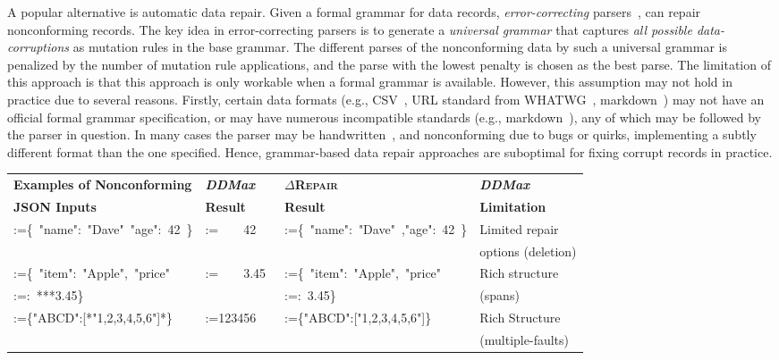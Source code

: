 \documentclass[acmsmall,screen,review,anonymous]{acmart}
\makeatletter
\newcommand{\dtask}{data repair\xspace}
\newcommand{\approach}{\textsc{$\Delta$Repair}\xspace}
\newcommand{\ddmax}{\textit{DDMax}\xspace}
\newcommand\letterboxedinTable[1]{%
\setlength{\fboxsep}{0pt}%
  \@tfor\@ii:=#1\do{%
    \fcolorbox{white}{light-gray}{\tiny \texttt{\strut\@ii}}%
  }%
}
\makeatother
\begin{document}
A popular alternative is automatic \dtask.
Given a formal grammar for data records,
\emph{error-correcting} parsers~\cite{aho1972minimum,diekmann2020dont,parr2011ll}, can
repair nonconforming records.
The key idea in error-correcting parsers is to generate a \emph{universal grammar}
that captures \emph{all possible data-corruptions} as mutation rules
in the base grammar.
The different parses of the nonconforming data by such a universal grammar is
penalized by the number of mutation rule applications, and the parse with the
lowest penalty is chosen as the best parse.
The limitation of this approach is that this approach is only workable when
a formal grammar is available.
However,
this assumption may not hold in practice due to several reasons.
Firstly,
certain data formats (e.g., CSV~\cite{taocp},
URL standard from WHATWG~\cite{whatwgurl,urldisagree}, markdown~\cite{gruber2004markdown})
may not have an official formal grammar specification, or may
have numerous incompatible standards
(e.g., markdown~\cite{gruber2004markdown}), any of which may be followed by the
parser in question. In many cases the parser may be handwritten~\cite{uncommongrammars,uncommongrammars2}, and nonconforming due to bugs or quirks,
implementing a subtly different format than the one specified.
Hence, grammar-based \dtask approaches
are suboptimal for fixing corrupt records in practice.

\begin{table*}\centering

\caption{\ddmax vs. \approach: examples showing limitations of \ddmax and the strengths of \approach}
{%
\begin{tabular}{|l | l | l | l |}
\hline
\textbf{Examples of Nonconforming}& \textbf{\ddmax} & \textbf{\approach} & \textbf{\ddmax} \\
\textbf{JSON Inputs} & \textbf{Result} & \textbf{Result} & \textbf{Limitation} \\
\hline
\letterboxedinTable{\{\ "name":\ "Dave"\ "age":\ 42\ \}} &
\letterboxedinTable{\ \ \ \ 42\ }  &
\letterboxedinTable{\{\ "name":\ "Dave"\ ,"age":\ 42\ \}} &
Limited repair \\
& & & options (deletion) \\
\hline
\letterboxedinTable{\{\ "item":\ "Apple",\ "price"} & \letterboxedinTable{\ \ \ \
3.45\ } & \letterboxedinTable{\{\ "item":\ "Apple",\ "price"} & Rich structure
\\
\letterboxedinTable{:\ ***3.45\}} & &\letterboxedinTable{:\ 3.45\}} &  (spans) \\
\hline
\letterboxedinTable{\{"ABCD":[*"1,2,3,4,5,6"]*\}} &
\letterboxedinTable{123456} &
\letterboxedinTable{\{"ABCD":["1,2,3,4,5,6"]\}} &
Rich Structure\\

& & &  (multiple-faults)  \\
\hline
\end{tabular}}
\label{tab:ddmaxlimitations}
\end{table*}
\end{document}
